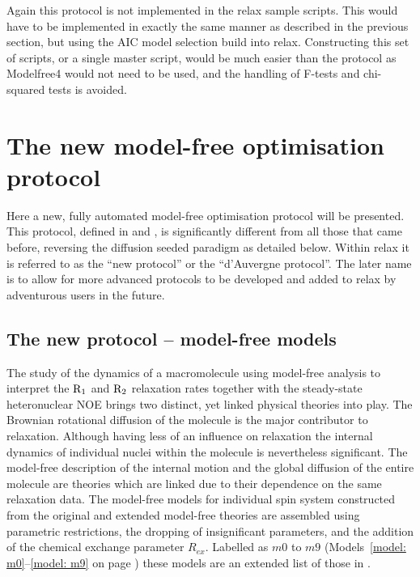 \begin{htmlonly}
\begin{htmlonly}
Again this protocol is not implemented in the relax sample scripts.  This would have to be implemented in exactly the same manner as described in the previous section, but using the AIC model selection build into relax.  Constructing this set of scripts, or a single master script, would be much easier than the \citet{Mandel95} protocol as Modelfree4 would not need to be used, and the handling of F-tests and chi-squared tests is avoided.




\section{The new model-free optimisation protocol}
\label{sect: new model-free protocol}

Here a new, fully automated model-free optimisation protocol will be presented.  This protocol, defined in \citet{dAuvergneGooley07} and \citet{dAuvergneGooley08b}, is significantly different from all those that came before, reversing the diffusion seeded paradigm as detailed below.  Within relax it is referred to as the ``new protocol'' or the ``d'Auvergne protocol''.  The later name is to allow for more advanced protocols to be developed and added to relax by adventurous users in the future.



\subsection{The new protocol -- model-free models}

The study of the dynamics of a macromolecule using model-free analysis to interpret the $\mathrm{R}_1$ and $\mathrm{R}_2$ relaxation rates together with the steady-state heteronuclear NOE brings two distinct, yet linked physical theories into play.  The Brownian rotational diffusion of the molecule is the major contributor to relaxation.  Although having less of an influence on relaxation the internal dynamics of individual nuclei within the molecule is nevertheless significant.  The model-free description of the internal motion and the global diffusion of the entire molecule are theories which are linked due to their dependence on the same relaxation data.  The model-free models for individual spin system constructed from the original and extended model-free theories \citep{LipariSzabo82a, LipariSzabo82b, Clore90a} are assembled using parametric restrictions, the dropping of insignificant parameters, and the addition of the chemical exchange parameter $R_{ex}$.  Labelled as $m0$ to $m9$ (Models~\ref{model: m0}--\ref{model: m9} on page \pageref{model: m9}) these models are an extended list of those in \citep{Fushman97, Orekhov99b, Korzhnev01, Zhuravleva04}.




\end{htmlonly}
\end{htmlonly}
